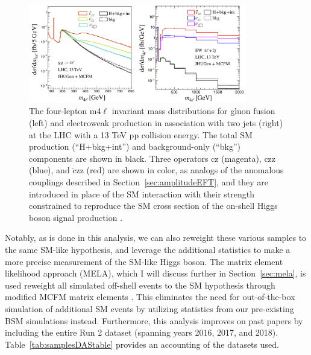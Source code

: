 \begin{figure}[!htb]
\centering
\includegraphics[width=0.85\textwidth,clip] {figures/offshellAC_BSI.png}
\caption{ The four-lepton m4$\ell$ invariant mass distributions for gluon fusion (left) and electroweak production in association with two jets (right) at the LHC with a 13 TeV pp collision energy. The total SM production (“H+bkg+int”) and background-only (“bkg”) components are shown in black. Three operators cz (magenta), czz (blue), and $\tilde{c}$zz (red) are shown in color, as analogs of the anomalous couplings described in Section~\ref{sec:amplitudeEFT}, and they are introduced in place of the SM interaction with their strength constrained to reproduce the SM cross section of the on-shell Higgs boson signal production \cite{offshellWGnote}.}
\label{fig:offshellAC_BSI}
\end{figure}

Notably, as is done in this analysis, we can also reweight these various samples to the same SM-like hypothesis, and leverage the additional statistics to make a more precise measurement of the SM-like Higgs boson. The matrix element likelihood approach (MELA), which I will discuss further in Section~\ref{sec:mela}, is used reweight all simulated off-shell events to the SM hypothesis through modified MCFM matrix elements \cite{12077235,10073492}. This eliminates the need for out-of-the-box simulation of additional SM events by utilizing statistics from our pre-existing BSM simulations instead. Furthermore, this analysis improves on past papers \cite{190100174} by including the entire Run 2 dataset (spanning years 2016, 2017, and 2018). Table~\ref{tab:samplesDAStable} provides an accounting of the datasets used.

